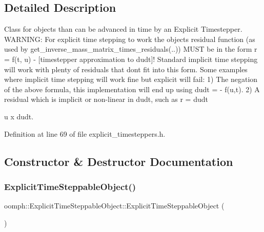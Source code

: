 \subsection{Detailed Description}
Class for objects than can be advanced in time by an Explicit Timestepper. W\+A\+R\+N\+I\+NG\+: For explicit time stepping to work the object\textquotesingle{}s residual function (as used by get\+\_\+inverse\+\_\+mass\+\_\+matrix\+\_\+times\+\_\+residuals(..)) M\+U\+ST be in the form r = f(t, u) -\/ \mbox{[}timestepper approximation to dudt\mbox{]}! Standard implicit time stepping will work with plenty of residuals that don\textquotesingle{}t fit into this form. Some examples where implicit time stepping will work fine but explicit will fail\+: 1) The negation of the above formula, this implementation will end up using dudt = -\/ f(u,t). 2) A residual which is implicit or non-\/linear in dudt, such as r = dudt
\begin{DoxyItemize}
\item u x dudt. 
\end{DoxyItemize}

Definition at line 69 of file explicit\+\_\+timesteppers.\+h.



\subsection{Constructor \& Destructor Documentation}
\mbox{\label{classoomph_1_1ExplicitTimeSteppableObject_a07e82e7df9f289fc59fbf5ac438ad068}} 
\subsubsection{\texorpdfstring{Explicit\+Time\+Steppable\+Object()}{ExplicitTimeSteppableObject()}\hspace{0.1cm}{\footnotesize\ttfamily [1/2]}}
{\footnotesize\ttfamily oomph\+::\+Explicit\+Time\+Steppable\+Object\+::\+Explicit\+Time\+Steppable\+Object (\begin{DoxyParamCaption}{ }\end{DoxyParamCaption})\hspace{0.3cm}{\ttfamily [inline]}}



